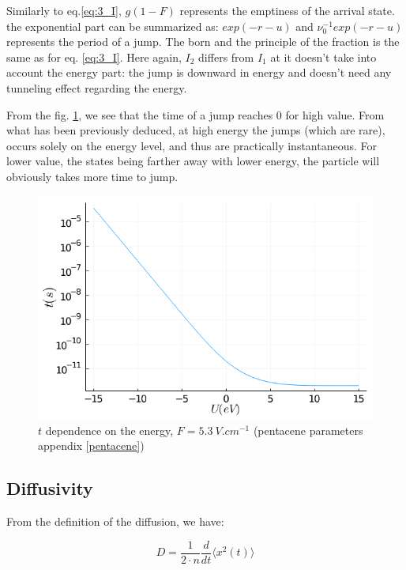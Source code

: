 Similarly to eq.\ref{eq:3_I}, $g(1 - F)$ represents the emptiness of the arrival state. the exponential part can be summarized as: $exp(-r - u)$ and $\nu_0^{-1} exp(-r - u)$ represents the period of a jump. The born and the principle of the fraction is the same as for eq. \ref{eq:3_I}. Here again, $I_2$ differs from $I_1$ at it doesn't take into account the energy part: the jump is downward in energy and doesn't need any tunneling effect regarding the energy.

From the fig. \ref{fig:3_10}, we see that the time of a jump reaches $0$ for high value. From what has been previously deduced, at high energy the jumps (which are rare), occurs solely on the energy level, and thus are practically instantaneous. For lower value, the states being farther away with lower energy, the particle will obviously takes more time to jump.

\begin{figure}[!h]
    \centering
    \includegraphics*[width=.5\paperwidth]{figures/3_elec/time_u.png}
    \caption{$t$ dependence on the energy, $F = \SI{5.3}{V . cm^{-1}}$ (pentacene parameters appendix \ref{pentacene})\label{fig:3_10}}
\end{figure}

\subsection{Diffusivity}

From the definition of the diffusion, we have:

\begin{equation}
    D = \frac{1}{2 \cdot n} \frac{d}{d t} \langle x^2(t) \rangle
    \label{eq:3_6}
\end{equation}


